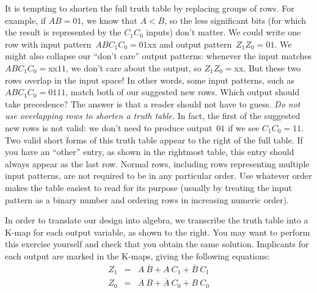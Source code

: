 It is tempting to shorten the full truth table by replacing groups of rows.
For example, if $AB=01$, we know that $A<B$, so the less significant
bits (for which the result is represented by the $C_1C_0$ inputs)
don't matter.  We could write one row with input pattern~$ABC_1C_0=01$xx and
output pattern~$Z_1Z_0=01$.  We might also collapse our ``don't care'' output
patterns: whenever the input matches $ABC_1C_0=$xx$11$, we don't care
about the output, so $Z_1Z_0=$xx.  But these two rows overlap in the
input space!  In other words, some input patterns, such as $ABC_1C_0=0111$,
match both of our suggested new rows.  Which output should take precedence?
The answer is that a reader should not have to guess.  {\em Do not use 
overlapping rows to shorten a truth table.}  In fact, the first of the 
suggested new rows is not valid: we don't need to produce output~$01$ 
if we see $C_1C_0=11$.  Two valid short forms of this truth table appear to 
the right of the full table.  If you have an ``other'' entry, as
shown in the rightmost table, this entry should always appear as the 
last row.  Normal rows, including rows representing multiple input
patterns, are not required
to be in any particular order.  Use whatever order makes the table
easiest to read for its purpose (usually by treating the input pattern
as a binary number and ordering rows in increasing numeric order).

\begin{minipage}{3.9in}
In order to translate our design into algebra, we transcribe the truth
table into a \mbox{K-map} for each output variable, as shown to the right.
You may want to perform this exercise yourself and check that you 
obtain the same solution.  Implicants for each output are marked
in the \mbox{K-maps}, giving the following equations:
%
\begin{eqnarray*}
Z_1 &=& A~\overline{B} + A~C_1 + \overline{B}~C_1\\
Z_0 &=& \overline{A}~B + \overline{A}~C_0 + B~C_0 
\end{eqnarray*}
\end{minipage}\hspace{.25in}%
\begin{minipage}{1.05in}
\end{minipage}\hspace{.25in}%
\begin{minipage}{1.05in}
\end{minipage}

